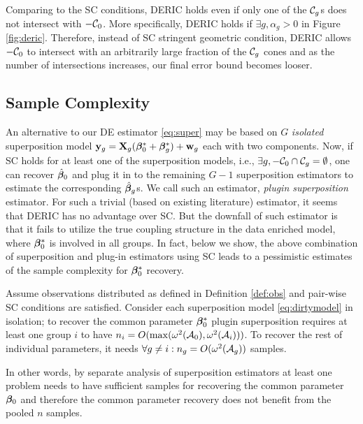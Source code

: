 

\begin{remark}
Comparing to the SC conditions, DERIC holds even if only one of the $\cC_g$s does not intersect with $-\cC_0$. More specifically, DERIC holds if $\exists g, \alpha_g > 0$ in Figure \ref{fig:deric}. Therefore, instead of SC stringent geometric condition, DERIC allows $-\cC_0$ to intersect with an arbitrarily large fraction of the $\cC_g$ cones and as the number of intersections increases, our final error bound becomes looser.
\end{remark}

\subsection{Sample Complexity}
An alternative to our DE estimator \eqref{eq:super} may be based on $G$ \emph{isolated} superposition model $\mathbf{y}_g = \mathbf{X}_g (\boldsymbol{\beta} _0^* + \boldsymbol{\beta} _g^*) + \mathbf{w}_g$ each with two components. Now, if SC holds for at least one of the superposition models, i.e., $\exists g, -\cC_0 \cap \cC_g = \emptyset$, one can recover $\hat{\boldsymbol{\beta}}_0$ and plug it in to the remaining $G-1$ superposition estimators to estimate the corresponding $\hat{\boldsymbol{\beta}}_g$s. We call such an estimator, \emph{plugin superposition} estimator. For such a trivial (based on existing literature) estimator, it seems that DERIC has no advantage over SC. But the downfall of such estimator is that it fails to utilize the true coupling structure in the data enriched model, where $\boldsymbol{\beta}^*_0$ is involved in all groups. In fact, below we show, the above combination of superposition and plug-in estimators using SC leads to a pessimistic estimates of the sample complexity for $\boldsymbol{\beta}^*_0$ recovery.
\begin{prop}
	\label{prop:super}
	Assume observations distributed as defined in Definition \ref{def:obs} and pair-wise SC conditions are satisfied.  Consider each superposition model \eqref{eq:dirtymodel} in isolation; to recover the common parameter $\boldsymbol{\beta} _0^*$ plugin superposition requires at least one group $i$ to have $n_i = O(\max(\omega^2(\cA_0), \omega^2(\cA_i)))$. 
	To recover the rest of individual parameters, it needs $\forall g \neq i: n_g = O(\omega^2(\cA_g))$ samples. 
\end{prop}
In other words, by separate analysis of superposition estimators at least one problem needs to have sufficient samples for recovering the common parameter $\boldsymbol{\beta}_0$ and therefore the common parameter recovery does not benefit from the pooled $n$ samples.
